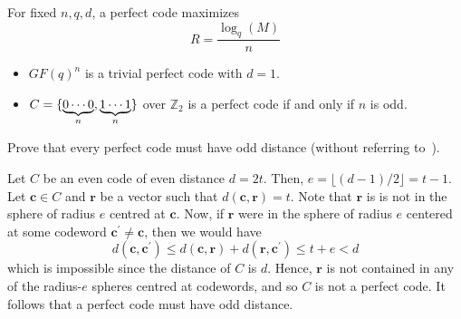 For fixed $ n,q,d $, a perfect code maximizes
\[ R=\frac{\log_q(M)}{n} \]

\begin{Example}{}{}
    \begin{itemize}
        \item $ GF(q)^n $ is a trivial perfect code with $ d=1 $.
        \item $ C=\{\underbrace{0\cdots 0}_{n},\underbrace{1\cdots 1}_{n}\} $
              over $ \mathbb{Z}_2 $ is a perfect code if and only if $ n $ is odd.
    \end{itemize}
\end{Example}

\begin{Exercise}{}{}
    Prove that every perfect code must have odd distance
    (without referring to~).
\end{Exercise}

\begin{Proof}{}{}
    Let $ C $ be an even code of even distance $ d=2t $. Then, $ e=\lfloor(d-1)/2\rfloor=t-1 $.
    Let $ \symbf{c}\in C $ and $ \symbf{r} $ be a vector such that $ d(\symbf{c},\symbf{r})=t $.
    Note that $ \symbf{r} $ is is not in the sphere of radius $ e $ centred at $ \symbf{c} $.
    Now, if $ \symbf{r} $ were in the sphere of radius $ e $ centered at some codeword
    $ \symbf{c}^\prime\neq\symbf{c} $, then we would have
    \[ d(\symbf{c},\symbf{c}^\prime)\leqslant d(\symbf{c},\symbf{r})+d(\symbf{r},\symbf{c}^\prime)\leqslant t+e
        <d \]
    which is impossible since the distance of $ C $ is $ d $. Hence, $ \symbf{r} $ is not contained
    in any of the radius-$ e $ spheres centred at codewords, and so $ C $ is not
    a perfect code. It follows that a perfect code must have odd distance.
\end{Proof}


